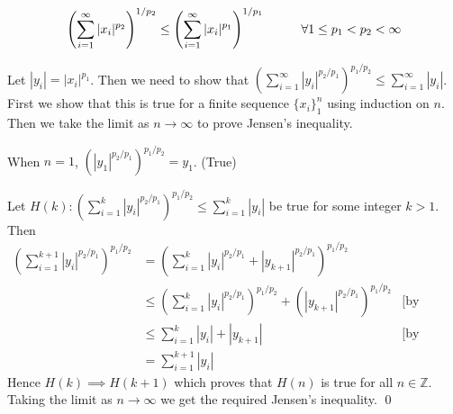 
\begin{solution}
    $$\left(\sum_{i=1}^{\infty}{|x_i|^{p_2}}\right)^{1/{p_2}}
    \leq\left(\sum_{i=1}^{\infty}{|x_i|^{p_1}}\right)^
    {1/{p_1}}\hspace*{10mm}\forall 1\leq p_1<p_2<\infty$$
  
    
    Let $|y_i|=|x_i|^{p_1}$. Then we need to show that
    $\left(\sum_{i=1}^{\infty}{|y_i|^{p_2/p_1}}\right)
    ^{{p_1/p_2}}
    \leq\sum_{i=1}^{\infty}{|y_i|}$. First we show that
    this is true for a finite sequence $\{x_i\}_1^{n}$
    using induction on $n$. Then we take the limit as
    $n\to \infty$ to prove Jensen's inequality.

    \setlength{\parskip}{3mm}
    When $n=1$, $(|y_1|^{p_2/p_1})^{p_1/p_2}=y_1$.
    (True)

    \setlength{\parskip}{3mm}
    Let $H(k):\left(\sum_{i=1}^{k}{|y_i|^{p_2/p_1}}\right)^{p_1/{p_2}}
    \leq\sum_{i=1}^{k}{|y_i|}$ be true for some integer
    $k>1$. Then
    \begin{align*}
      \left(\sum_{i=1}^{k+1}{|y_i|^{p_2/p_1}}\right)^{p_1/{p_2}}
      &=\left(\sum_{i=1}^{k}{|y_i|^{p_2/p_1}}
      +|y_{k+1}|^{p_2/p_1}\right)^{p_1/{p_2}}&\\
      &\leq \left(\sum_{i=1}^{k}{|y_i|^{p_2/p_1}}\right)
      ^{p_1/p_2}
      +\left(|y_{k+1}|^{p_2/p_1}\right)^{p_1/{p_2}}
      &\text{[by Minkowski inequality]}\\
      &\leq \sum_{i=1}^{k}{|y_i|}+|y_{k+1}|
      &\text{[by induction hypothesis]}\\
      &=\sum_{i=1}^{k+1}{|y_i|}
    \end{align*}
    Hence $H(k)\implies H(k+1)$ which proves that $H(n)$ is
    true for all $n\in \mathbb{Z}$. Taking the limit
    as $n\to\infty$ we get the required Jensen's inequality.
  \qed
\end{solution}